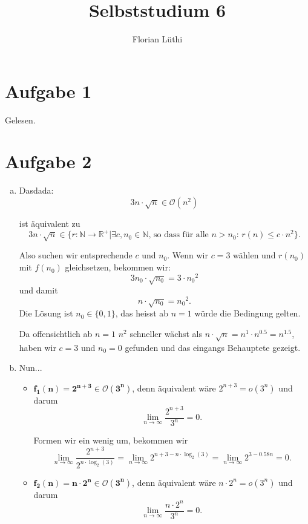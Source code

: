 \documentclass[11pt]{article} %
\title{Selbststudium 6}
\author{Florian Lüthi}
\theoremstyle{definition}
\begin{document}
\maketitle

\section*{Aufgabe 1}

Gelesen.

\section*{Aufgabe 2}

\begin{enumerate}[(a)]

\item Dasdada:
\[
3n \cdot \sqrt{n} \in \mathcal{O}(n^2)
\]

ist äquivalent zu
\[
3n \cdot \sqrt{n} \in \{ r: \mathbb{N} \rightarrow \mathbb{R}^+ | \exists c, n_0 \in \mathbb{N} \textrm{, so dass für alle $n > n_0$: } r(n) \le c \cdot n^2 \}.
\]

Also suchen wir entsprechende $c$ und $n_0$. Wenn wir $c = 3$ wählen und $r(n_0)$ mit $f(n_0)$ gleichsetzen, bekommen wir:
\[
3n_0 \cdot \sqrt{n_0} = 3\cdot {n_0}^2
\]
und damit
\[
n \cdot \sqrt{n_0} = {n_0}^2.
\]
Die Lösung ist $n_0 \in \{0, 1\}$, das heisst ab $n = 1$ würde die Bedingung gelten.

Da offensichtlich ab $n = 1$ $n^2$ schneller wächst als $n\cdot \sqrt{n} = n^1 \cdot n^{0.5} = n^{1.5}$, haben wir $c =3$ und $n_0 = 0$ gefunden und das eingangs Behauptete gezeigt.

\item Nun...
\begin{itemize}

\item ${\mathbf{f_1(n) = 2^{n+3} \in \mathcal{O}(3^n)}}$, denn äquivalent wäre $2^{n+3} = o(3^n)$ und darum
\[
\lim_{n\rightarrow \infty} \frac{2^{n+3}}{3^n} = 0.
\]

Formen wir ein wenig um, bekommen wir
\[
\lim_{n\rightarrow \infty} \frac{2^{n+3}}{2^{n\cdot \log_2(3)}}  = \lim_{n\rightarrow \infty} 2^{n + 3 - n\cdot \log_2(3)} = \lim_{n\rightarrow \infty} 2^{3-0.58n} = 0.
\]

\item ${\mathbf{f_2(n) = n\cdot 2^n \in \mathcal{O}(3^n)}}$, denn äquivalent wäre $n \cdot 2^n = o(3^n)$ und darum
\[
\lim_{n\rightarrow \infty} \frac{n \cdot 2^n}{3^n} = 0.
\]


\end{itemize}
\end{enumerate}
\end{document}
